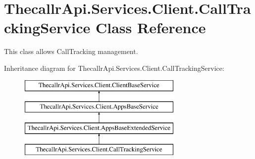 \hypertarget{class_thecallr_api_1_1_services_1_1_client_1_1_call_tracking_service}{\section{Thecallr\+Api.\+Services.\+Client.\+Call\+Tracking\+Service Class Reference}
\label{class_thecallr_api_1_1_services_1_1_client_1_1_call_tracking_service}
}


This class allows Call\+Tracking management.  


Inheritance diagram for Thecallr\+Api.\+Services.\+Client.\+Call\+Tracking\+Service\+:\begin{figure}[H]
\begin{center}
\leavevmode
\includegraphics[height=4.000000cm]{class_thecallr_api_1_1_services_1_1_client_1_1_call_tracking_service}
\end{center}
\end{figure}

